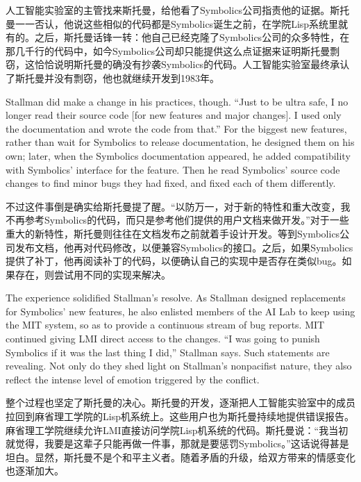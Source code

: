 \ifdefined\chs
人工智能实验室的主管找来斯托曼，给他看了Symbolics公司指责他的证据。斯托曼一一否认，他说这些相似的代码都是Symbolics诞生之前，在学院Lisp系统里就有的。之后，斯托曼话锋一转：他自己已经克隆了Symbolics公司的众多特性，在那几千行的代码中，如今Symbolics公司却只能提供这么点证据来证明斯托曼剽窃，这恰恰说明斯托曼的确没有抄袭Symbolics的代码。人工智能实验室最终承认了斯托曼并没有剽窃，他也就继续开发到1983年。
\fi

\ifdefined\eng
Stallman did make a change in his practices, though.  ``Just to be ultra safe, I no longer read their source code [for new features and major changes]. I used only the documentation and wrote the code from that.''  For the biggest new features, rather than wait for Symbolics to release documentation, he designed them on his own; later, when the Symbolics documentation appeared, he added compatibility with Symbolics' interface for the feature.  Then he read Symbolics' source code changes to find minor bugs they had fixed, and fixed each of them differently.
\fi

\ifdefined\chs
不过这件事倒是确实给斯托曼提了醒。``以防万一，对于新的特性和重大改变，我不再参考Symbolics的代码，而只是参考他们提供的用户文档来做开发。''对于一些重大的新特性，斯托曼则往往在文档发布之前就着手设计开发。等到Symbolics公司发布文档，他再对代码修改，以便兼容Symbolics的接口。之后，如果Symbolics提供了补丁，他再阅读补丁的代码，以便确认自己的实现中是否存在类似bug。如果存在，则尝试用不同的实现来解决。
\fi

\ifdefined\eng
The experience solidified Stallman's resolve. As Stallman designed replacements for Symbolics' new features, he also enlisted members of the AI Lab to keep using the MIT system, so as to provide a continuous stream of bug reports. MIT continued giving LMI direct access to the changes. ``I was going to punish Symbolics if it was the last thing I did,'' Stallman says.  Such statements are revealing. Not only do they shed light on Stallman's nonpacifist nature, they also reflect the intense level of emotion triggered by the conflict.
\fi

\ifdefined\chs
整个过程也坚定了斯托曼的决心。斯托曼的开发，逐渐把人工智能实验室中的成员拉回到麻省理工学院的Lisp机系统上。这些用户也为斯托曼持续地提供错误报告。麻省理工学院继续允许LMI直接访问学院Lisp机系统的代码。斯托曼说：``我当初就觉得，我要是这辈子只能再做一件事，那就是要惩罚Symbolics。''这话说得甚是坦白。显然，斯托曼不是个和平主义者。随着矛盾的升级，给双方带来的情感变化也逐渐加大。
\fi
\fi

